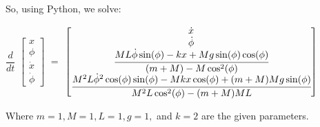 \documentclass[11pt]{article}
\begin{document}
\begin{enumerate}
So, using Python, we solve:
\begin{center}
  $\dfrac{d}{dt}$
$\begin{bmatrix}
  x \\
  \phi \\
  \dot{x} \\
  \dot{\phi} 
\end{bmatrix}$
$ = $
$\begin{bmatrix}
  \dot{x} \\
  \dot{\phi} \\
  \cfrac{ML\dot{\phi}\sin(\phi) - kx + Mg\sin(\phi)\cos(\phi)}{(m+M) - M\cos^2(\phi)} \\
  \cfrac{M^2L\dot{\phi}^2\cos(\phi)\sin(\phi) - Mkx\cos(\phi) + (m+M)Mg\sin(\phi)}{M^2 L \cos^2(\phi) - (m+M)ML}
\end{bmatrix}$
\end{center}

Where $m = 1, M = 1, L = 1, g = 1,$ and $k = 2$ are the given parameters.

\end{enumerate}
\end{document}
